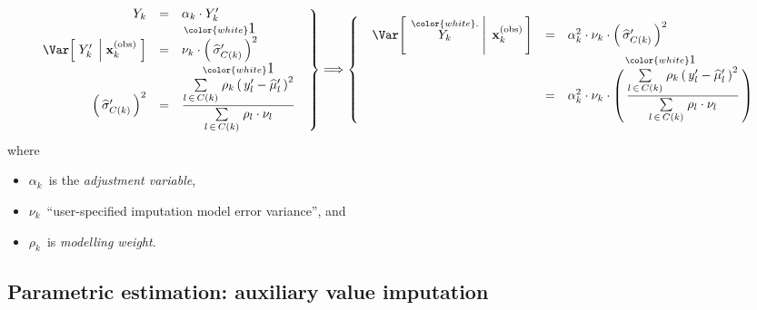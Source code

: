 \begin{equation*}
\left.\begin{array}{rcl}
Y_{k}
& = &
    \alpha_{k} \cdot Y^{\prime}_{k}
\\
\Var\!\left[\;
    Y^{\prime}_{k}
    \;\left\vert\;
    \mathbf{x}^{\textnormal{(obs)}}_{k}
    \right.
    \,\right]
& = &
    \overset{{\color{white}\textnormal{\large$1$}}}{
    \nu_{k}\cdot\left(\,\widehat{\sigma}^{\prime}_{C(k)}\,\right)^{2}
    }
\\
\left(\,\widehat{\sigma}^{\prime}_{C(k)}\,\right)^{2}
& = &
    \overset{{\color{white}\textnormal{\large$1$}}}{
    \dfrac{
        \underset{l\,\in\,C(k)}{\sum}\;
        \rho_{k}
        \left(\,y^{\prime}_{l} - \widehat{\mu}^{\prime}_{l}\,\right)^{2}
        }{
        \underset{l\,\in\,C(k)}{\sum}\;
        \rho_{l}\cdot\nu_{l}
        }
    }
\end{array}
\;\;\right\}
\Longrightarrow
\left\{\;\;
\begin{array}{ccl}
\Var\!\left[\;
    \left.
    \overset{{\color{white}.}}{Y_{k}}
    \;\right\vert\;
    \mathbf{x}^{\textnormal{(obs)}}_{k}
    \,\right]
& = &
    \alpha_{k}^{2}
    \cdot
    \nu_{k}
    \cdot 
    \left(\,\widehat{\sigma}^{\prime}_{C(k)}\,\right)^{2}
\\
& = &
    \overset{{\color{white}\textnormal{\small$1$}}}{
    \alpha_{k}^{2}
    \cdot
    \nu_{k}
    \cdot 
    \left(\,
    \dfrac{
        \underset{l\,\in\,C(k)}{\sum}\;
        \rho_{k}
        \left(\,y^{\prime}_{l} - \widehat{\mu}^{\prime}_{l}\,\right)^{2}
        }{
        \underset{l\,\in\,C(k)}{\sum}\;
        \rho_{l}\cdot\nu_{l}
        }
        \,\right)
    }
\end{array}
\right.
\end{equation*}
where
\begin{itemize}
\item
    $\alpha_{k}$\, is the \textit{adjustment variable},
\item
    $\nu_{k}$\, ``user-specified imputation model error variance'', and
\item
    $\rho_{k}$\, is \textit{modelling weight}.
\end{itemize}


\subsection{Parametric estimation: auxiliary value imputation}

